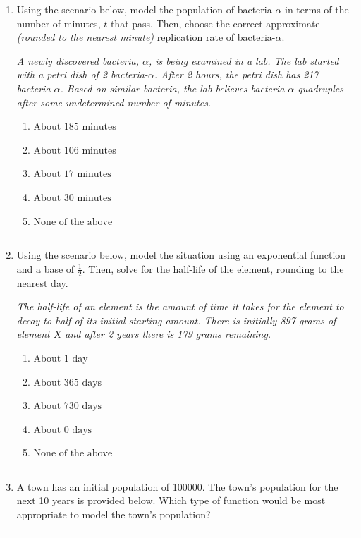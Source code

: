 \documentclass[14pt]{extbook}
\newcommand{\litem}[1]{\item#1\hspace*{-1cm}\rule{\textwidth}{0.4pt}}
\begin{document}
\begin{enumerate}
\litem{
Using the scenario below, model the population of bacteria $\alpha$ in terms of the number of minutes, $t$ that pass. Then, choose the correct approximate \textit{(rounded to the nearest minute)} replication rate of bacteria-$\alpha$.
\begin{center}
    \textit{ A newly discovered bacteria, $\alpha$, is being examined in a lab. The lab started with a petri dish of 2 bacteria-$\alpha$. After 2 hours, the petri dish has 217 bacteria-$\alpha$. Based on similar bacteria, the lab believes bacteria-$\alpha$ quadruples after some undetermined number of minutes. }
\end{center}
\begin{enumerate}[label=\Alph*.]
\item \( \text{About } 185 \text{ minutes} \)
\item \( \text{About } 106 \text{ minutes} \)
\item \( \text{About } 17 \text{ minutes} \)
\item \( \text{About } 30 \text{ minutes} \)
\item \( \text{None of the above} \)

\end{enumerate} }
\litem{
Using the scenario below, model the situation using an exponential function and a base of $\frac{1}{2}$. Then, solve for the half-life of the element, rounding to the nearest day.
\begin{center}
    \textit{ The half-life of an element is the amount of time it takes for the element to decay to half of its initial starting amount. There is initially 897 grams of element $X$ and after 2 years there is 179 grams remaining. }
\end{center}
\begin{enumerate}[label=\Alph*.]
\item \( \text{About } 1 \text{ day} \)
\item \( \text{About } 365 \text{ days} \)
\item \( \text{About } 730 \text{ days} \)
\item \( \text{About } 0 \text{ days} \)
\item \( \text{None of the above} \)

\end{enumerate} }
\litem{
A town has an initial population of 100000. The town's population for the next 10 years is provided below. Which type of function would be most appropriate to model the town's population?

}
\end{enumerate}
\end{document}
